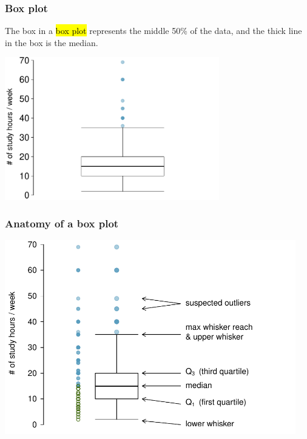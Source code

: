 \begin{frame}
\frametitle{Box plot}

The box in a \hl{box plot} represents the middle 50\% of the data, and the thick line in the box is the median.

\begin{center}
\includegraphics[width=0.7\textwidth]{1-6_numerical_data/figures/study_hours/study_hours_box}
\end{center}

\end{frame}


\begin{frame}
\frametitle{Anatomy of a box plot}

\begin{center}
\includegraphics[width=0.95\textwidth]{1-6_numerical_data/figures/study_hours/study_hours_box_layout}
\end{center}

\end{frame}


